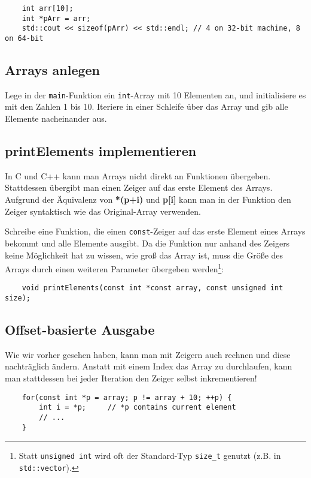 \begin{lstlisting}
	int arr[10];
	int *pArr = arr;
	std::cout << sizeof(pArr) << std::endl; // 4 on 32-bit machine, 8 on 64-bit
\end{lstlisting}

\subsection{Arrays anlegen}
Lege in der \lstinline{main}-Funktion ein \lstinline{int}-Array mit 10 Elementen an, und initialisiere es mit den Zahlen 1 bis 10.
Iteriere in einer Schleife über das Array und gib alle Elemente nacheinander aus.

\subsection{printElements implementieren}
In C und C++ kann man Arrays nicht direkt an Funktionen übergeben.
Stattdessen übergibt man einen Zeiger auf das erste Element des Arrays. Aufgrund der Äquivalenz von \textbf{*(p+i) } und \textbf{p[i]} kann man in der Funktion den Zeiger syntaktisch wie das Original-Array verwenden.

Schreibe eine Funktion, die einen \lstinline{const}-Zeiger auf das erste Element eines Arrays bekommt und alle Elemente ausgibt.
Da die Funktion nur anhand des Zeigers keine Möglichkeit hat zu wissen, wie groß das Array ist, muss die Größe des Arrays durch einen weiteren Parameter übergeben werden\footnote{Statt \lstinline{unsigned int} wird oft der Standard-Typ \lstinline{size_t} genutzt (z.B. in \lstinline{std::vector}).}:

\begin{lstlisting}
	void printElements(const int *const array, const unsigned int size);
\end{lstlisting}

\subsection{Offset-basierte Ausgabe}
Wie wir vorher gesehen haben, kann man mit Zeigern auch rechnen und diese nachträglich ändern.
Anstatt mit einem Index das Array zu durchlaufen, kann man stattdessen bei jeder Iteration den Zeiger selbst inkrementieren!

\begin{lstlisting}
	for(const int *p = array; p != array + 10; ++p) {
		int i = *p;		// *p contains current element
		// ...
	}
\end{lstlisting}

